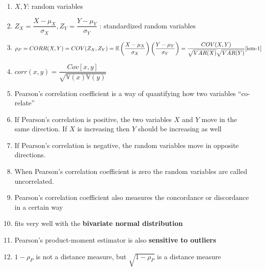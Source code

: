 \begin{enumerate}
    \item[] $X,Y$: random variables
    
    \vspace{0.1cm}
    \item[] $
        Z_X = \dfrac{X - \mu_X}{\sigma_X},
        Z_Y = \dfrac{Y - \mu_Y}{\sigma_Y}
    $ : standardized random variables

    \vspace{0.2cm}
    
    \item[] 
    \[
        \rho_P 
        = CORR(X,Y)
        = COV(Z_X, Z_Y)
        = \mathbb{E}\dParenBrac{ \dfrac{X - \mu_X}{\sigma_X}} \dParenBrac{ \dfrac{Y - \mu_Y}{\sigma_Y} }
        = \dfrac{COV(X,Y)}{\sqrt{VAR(X)} \sqrt{VAR(Y)}}
        \hfill \text{\cite{ism-1}}
    \]
    
    \item[] $
        corr(x,y)
        = \dfrac{Cov[x,y]}{\sqrt{\mathbb{V}(x) \mathbb{V}(y)}}
    $ \hfill \cite{mfml-1}
    
    \vspace{0.2cm}
    
    \item Pearson’s correlation coefficient is a way of quantifying how two variables “co-relate”

    \item If Pearson’s correlation is positive, the two variables $X$ and $Y$ move in the same direction. If $X$ is increasing then $Y$ should be increasing as well

    \item If Pearson’s correlation is negative, the random variables move in opposite directions.

    \item When Pearson’s correlation coefficient is zero the random variables are called uncorrelated.

    \item Pearson’s correlation coefficient also measures the concordance or discordance in a certain way

    \item fits very well with the \textbf{bivariate normal distribution}

    \item Pearson’s product-moment estimator is also \textbf{sensitive to outliers}

    \item $1-\rho_P$ is not a distance measure, but $\sqrt{1-\rho_P}$ is a distance measure


\end{enumerate}
